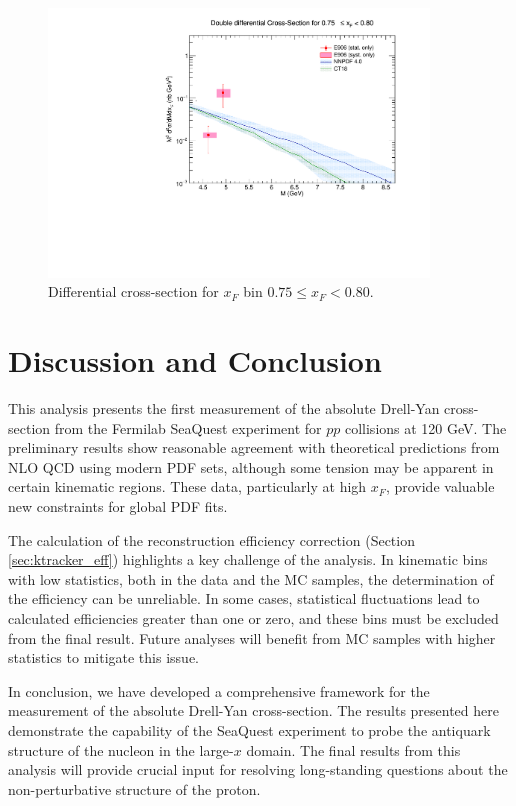 \documentclass[11pt]{article}
\begin{document}
\clearpage
\begin{figure}[p]
\centering
\includegraphics[width=0.9\textwidth]{./XSecPlots/LH2_15_roofit.pdf}
\caption{Differential cross-section for $x_F$ bin $0.75 \leq x_F < 0.80$.}
\end{figure}
\clearpage

\section{Discussion and Conclusion}
\label{sec:conclusion}
This analysis presents the first measurement of the absolute Drell-Yan cross-section from the Fermilab SeaQuest experiment for $pp$ collisions at 120 GeV. The preliminary results show reasonable agreement with theoretical predictions from NLO QCD using modern PDF sets, although some tension may be apparent in certain kinematic regions. These data, particularly at high $x_F$, provide valuable new constraints for global PDF fits.

The calculation of the reconstruction efficiency correction (Section \ref{sec:ktracker_eff}) highlights a key challenge of the analysis. In kinematic bins with low statistics, both in the data and the MC samples, the determination of the efficiency can be unreliable. In some cases, statistical fluctuations lead to calculated efficiencies greater than one or zero, and these bins must be excluded from the final result. Future analyses will benefit from MC samples with higher statistics to mitigate this issue.

In conclusion, we have developed a comprehensive framework for the measurement of the absolute Drell-Yan cross-section. The results presented here demonstrate the capability of the SeaQuest experiment to probe the antiquark structure of the nucleon in the large-$x$ domain. The final results from this analysis will provide crucial input for resolving long-standing questions about the non-perturbative structure of the proton.
\end{document}
